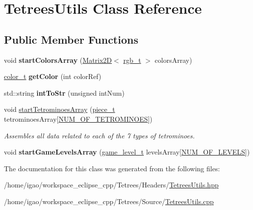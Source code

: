 \hypertarget{classTetreesUtils}{}\section{Tetrees\+Utils Class Reference}
\label{classTetreesUtils}
\subsection*{Public Member Functions}
\begin{DoxyCompactItemize}
\item 
\mbox{\label{classTetreesUtils_afaeab256a68024309eefbbdfae158397}} 
void {\bfseries start\+Colors\+Array} (\hyperlink{classMatrix2D}{Matrix2D}$<$ \hyperlink{structrgb__t}{rgb\+\_\+t} $>$ colors\+Array)
\item 
\mbox{\label{classTetreesUtils_a812d9a7bee07fef5dfcec1fd36c4b502}} 
\hyperlink{TetreesDefs_8hpp_a8ba5fbce2446135735693ab60c896bbd}{color\+\_\+t} {\bfseries get\+Color} (int color\+Ref)
\item 
\mbox{\label{classTetreesUtils_ad6ece1c845969a3535b8a6d971d8ddcb}} 
std\+::string {\bfseries int\+To\+Str} (unsigned int\+Num)
\item 
\mbox{\label{classTetreesUtils_acb377319f6772d9e88f677273c895912}} 
void \hyperlink{classTetreesUtils_acb377319f6772d9e88f677273c895912}{start\+Tetrominoes\+Array} (\hyperlink{structpiece__t}{piece\+\_\+t} tetrominoes\+Array\mbox{[}\hyperlink{TetreesDefs_8hpp_a69fa4aa1afe74f7f9ec42bf1e07ddf28}{N\+U\+M\+\_\+\+O\+F\+\_\+\+T\+E\+T\+R\+O\+M\+I\+N\+O\+ES}\mbox{]})
\begin{DoxyCompactList}\small\item\em Assembles all data related to each of the 7 types of tetrominoes. \end{DoxyCompactList}\item 
\mbox{\label{classTetreesUtils_a1bbb7dbec571bf3490fd74fcdacc7640}} 
void {\bfseries start\+Game\+Levels\+Array} (\hyperlink{structgame__level__t}{game\+\_\+level\+\_\+t} levels\+Array\mbox{[}\hyperlink{TetreesDefs_8hpp_a350a4204247d3562e237e289533cc31f}{N\+U\+M\+\_\+\+O\+F\+\_\+\+L\+E\+V\+E\+LS}\mbox{]})
\end{DoxyCompactItemize}


The documentation for this class was generated from the following files\+:\begin{DoxyCompactItemize}
\item 
/home/igao/workspace\+\_\+eclipse\+\_\+cpp/\+Tetrees/\+Headers/\hyperlink{TetreesUtils_8hpp}{Tetrees\+Utils.\+hpp}\item 
/home/igao/workspace\+\_\+eclipse\+\_\+cpp/\+Tetrees/\+Source/\hyperlink{TetreesUtils_8cpp}{Tetrees\+Utils.\+cpp}\end{DoxyCompactItemize}
